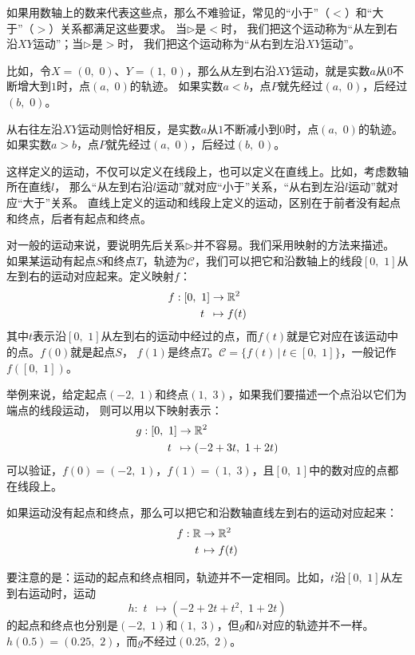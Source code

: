 \documentclass[12pt,UTF8]{ctexbook}
\begin{document}
如果用数轴上的数来代表这些点，那么不难验证，常见的“小于”（$<$）和“大于”（$>$）关系都满足这些要求。
当$\triangleright$是$<$时，
我们把这个运动称为“从左到右沿$XY$运动”；当$\triangleright$是$>$时，
我们把这个运动称为“从右到左沿$XY$运动”。

比如，令$X = (0,\,\,0)$、$Y = (1,\,\,0)$，那么从左到右沿$XY$运动，就是实数$a$从$0$不断增大到$1$时，点$(a,\,\,0)$的轨迹。
如果实数$a<b$，点$P$就先经过$(a,\,\,0)$，后经过$(b,\,\,0)$。

从右往左沿$XY$运动则恰好相反，是实数$a$从$1$不断减小到$0$时，点$(a,\,\,0)$的轨迹。
如果实数$a>b$，点$P$就先经过$(a,\,\,0)$，后经过$(b,\,\,0)$。

这样定义的运动，不仅可以定义在线段上，也可以定义在直线上。比如，考虑数轴所在直线$l$，
那么“从左到右沿$l$运动”就对应“小于”关系，“从右到左沿$l$运动”就对应“大于”关系。
直线上定义的运动和线段上定义的运动，区别在于前者没有起点和终点，后者有起点和终点。

对一般的运动来说，要说明先后关系$\triangleright$并不容易。我们采用映射的方法来描述。
如果某运动有起点$S$和终点$T$，轨迹为$\mathcal{C}$，我们可以把它和沿数轴上的线段$[0,\,\,1]$从左到右的运动对应起来。定义映射$f$：
\begin{align}
    f: [0,\,\,1] &\rightarrow \mathbb{R}^2 \notag \\
         t \,\,\, &\mapsto f(t) \notag
\end{align}
其中$t$表示沿$[0,\,\,1]$从左到右的运动中经过的点，而$f(t)$就是它对应在该运动中的点。$f(0)$就是起点$S$，
$f(1)$是终点$T$。$\mathcal{C} = \{f(t)\,|\,t\in[0,\,\,1]\}$，一般记作$f([0,\,\,1])$。

举例来说，给定起点$(-2,\,\,1)$和终点$(1,\,\,3)$，如果我们要描述一个点沿以它们为端点的线段运动，
则可以用以下映射表示：
\begin{align}
    g: [0,\,\,1] &\rightarrow \mathbb{R}^2 \notag \\
         t \,\,\, &\mapsto (-2 + 3t,\,\, 1 + 2t) \notag
\end{align}
可以验证，$f(0) = (-2,\,\,1)$，$f(1) = (1,\,\,3)$，且$[0,\,\,1]$中的数对应的点都在线段上。

如果运动没有起点和终点，那么可以把它和沿数轴直线左到右的运动对应起来：
\begin{align}
    f: \mathbb{R} &\rightarrow \mathbb{R}^2 \notag \\
         t \, &\mapsto f(t) \notag
\end{align}

要注意的是：运动的起点和终点相同，轨迹并不一定相同。比如，$t$沿$[0,\,\,1]$从左到右运动时，运动
$$ h: \,\, t \,\,\, \mapsto (-2 + 2t + t^2,\,\, 1 + 2t) $$
的起点和终点也分别是$(-2,\,\,1)$和$(1,\,\,3)$，但$g$和$h$对应的轨迹并不一样。
$h(0.5) = (0.25, \,\,2)$，而$g$不经过$(0.25, \,\,2)$。
\end{document}
